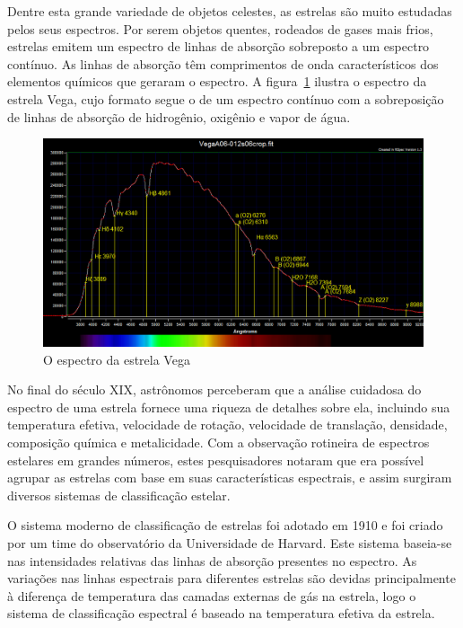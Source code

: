 Dentre esta grande variedade de objetos celestes, as estrelas são muito estudadas pelos seus espectros. Por serem objetos quentes, rodeados de gases mais frios, estrelas emitem um espectro de linhas de absorção sobreposto a um espectro contínuo. As linhas de absorção têm comprimentos de onda característicos dos elementos químicos que geraram o espectro. A figura~\ref{fig:vega-spectrum} ilustra o espectro da estrela Vega, cujo formato segue o de um espectro contínuo com a sobreposição de linhas de absorção de hidrogênio, oxigênio e vapor de água.

\begin{figure}[htb]
\centering
\includegraphics[width=12cm]{figuras/vega_spectrum.jpg}
\caption{O espectro da estrela Vega\citep{vega-spectrum}}
\label{fig:vega-spectrum}
\end{figure}

No final do século XIX, astrônomos perceberam que a análise cuidadosa do espectro de uma estrela fornece uma riqueza de detalhes sobre ela, incluindo sua temperatura efetiva, velocidade de rotação, velocidade de translação, densidade, composição química e metalicidade. Com a observação rotineira de espectros estelares em grandes números, estes pesquisadores notaram que era possível agrupar as estrelas com base em suas características espectrais, e assim surgiram diversos sistemas de classificação estelar. 

O sistema moderno de classificação de estrelas foi adotado em 1910 e foi criado por um time do observatório da Universidade de Harvard. Este sistema baseia-se nas intensidades relativas das linhas de absorção presentes no espectro. As variações nas linhas espectrais para diferentes estrelas são devidas principalmente à diferença de temperatura das camadas externas de gás na estrela, logo o sistema de classificação espectral é baseado na temperatura efetiva da estrela. 

